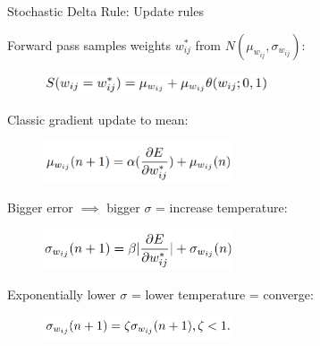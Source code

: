 \documentclass{beamer}
\begin{document}
\begin{frame}{Stochastic Delta Rule: Update rules}

Forward pass samples weights $w^{*}_{ij}$ from $N(\mu_{w_{ij}},\sigma_{w_{ij}})$:
\begin{figure}[h]
\includegraphics[width=0.6\textwidth]{img/init}
\end{figure}

Classic gradient update to mean:
\begin{figure}[h]
\includegraphics[width=0.5\textwidth]{img/update_mu}
\end{figure}

Bigger error $\implies$ bigger $\sigma$ = increase temperature:
\begin{figure}[h]
\includegraphics[width=0.5\textwidth]{img/update_sigma}
\end{figure}

Exponentially lower $\sigma$ = lower temperature = converge:
\begin{figure}[h]
\includegraphics[width=0.5\textwidth]{img/update_sigma_2}
\end{figure}



\end{frame}
\end{document}
